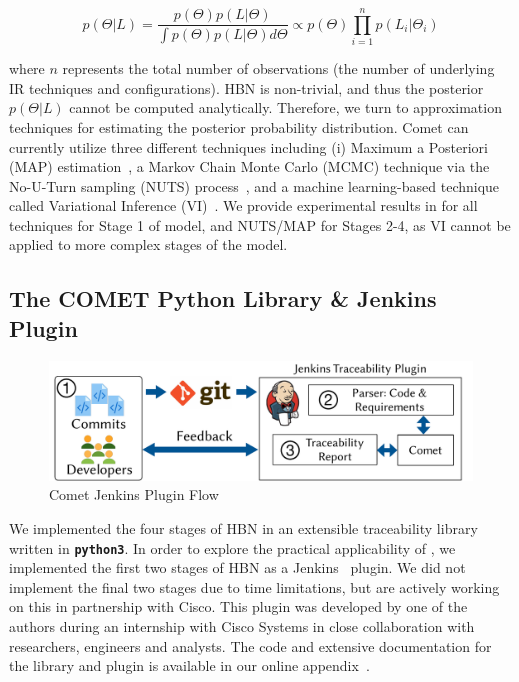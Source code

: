 \vspace{-0.3cm}
\begin{equation} \label{eq_bayes}
p(\Theta|L) = \dfrac{p(\Theta)p(L|\Theta)}{\int p(\Theta)p(L|\Theta)d\Theta} \propto p(\Theta) \prod\limits_{i=1}^n p(L_i|\Theta_i)
\end{equation}

\noindent where $n$ represents the total number of observations (\ie the number of underlying IR techniques and configurations).  \Comets HBN is non-trivial, and thus the posterior $p(\Theta|L)$ cannot be computed analytically. Therefore, we turn to approximation techniques for estimating the posterior probability distribution. Comet can currently utilize three different techniques including (i) Maximum a Posteriori (MAP) estimation~\citep{Bassett2018MaximumEstimators}, a Markov Chain Monte Carlo (MCMC) technique via the No-U-Turn sampling (NUTS) process~\citep{Hoffman2011TheCarlo}, and a machine learning-based technique called Variational Inference (VI)~\citep{Bishop:2006}. We provide experimental results in  for all techniques for Stage 1 of \Comets model, and NUTS/MAP for Stages 2-4, as VI cannot be applied to more complex stages of the model.

\subsection{\hspace{-0.1cm}
The C{\small OMET} Python Library \& Jenkins Plugin}
\label{sub:comet-jenkins}

\begin{figure}[h]
	\centering
	\includegraphics[width=\columnwidth]{graphics/chap_04-bayes/fig6_plugin-flow.pdf}
	\caption{Comet Jenkins Plugin Flow}
	\label{fig:plugin-flow}
\end{figure}


We implemented the four stages of \Comets HBN in an extensible traceability library written in \texttt{\textbf{\small python3}}. In order to explore the practical applicability of \Comet, we implemented the first two stages of \Comets HBN as a Jenkins~\cite{jenkins} plugin.  We did not implement the final two stages due to time limitations, but are actively working on this in partnership with Cisco. This plugin was developed by one of the authors during an internship with Cisco Systems in close collaboration with researchers, engineers and analysts. The code and extensive documentation for the \Comet library and plugin is available in our online appendix~\citep{appendix}.
	

